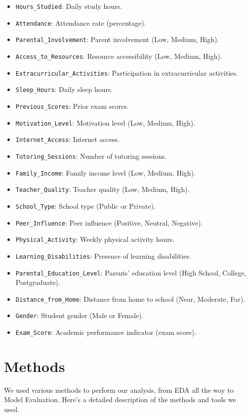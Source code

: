 \documentclass[twocolumn]{article} %
\begin{document}
\begin{itemize}
\item
  \texttt{Hours\_Studied}: Daily study hours.
\item
  \texttt{Attendance}: Attendance rate (percentage).
\item
  \texttt{Parental\_Involvement}: Parent involvement (Low, Medium, High).
\item
  \texttt{Access\_to\_Resources}: Resource accessibility (Low, Medium, High).
\item
  \texttt{Extracurricular\_Activities}: Participation in extracurricular
  activities.
\item
  \texttt{Sleep\_Hours}: Daily sleep hours.
\item
  \texttt{Previous\_Scores}: Prior exam scores.
\item
  \texttt{Motivation\_Level}: Motivation level (Low, Medium, High).
\item
  \texttt{Internet\_Access}: Internet access.
\item
  \texttt{Tutoring\_Sessions}: Number of tutoring sessions.
\item
  \texttt{Family\_Income}: Family income level (Low, Medium, High).
\item
  \texttt{Teacher\_Quality}: Teacher quality (Low, Medium, High).
\item
  \texttt{School\_Type}: School type (Public or Private).
\item
  \texttt{Peer\_Influence}: Peer influence (Positive, Neutral,
  Negative).
\item
  \texttt{Physical\_Activity}: Weekly physical activity hours.
\item
  \texttt{Learning\_Disabilities}: Presence of learning disabilities.
\item
  \texttt{Parental\_Education\_Level}: Parents' education level (High School, College, Postgraduate).
\item
  \texttt{Distance\_from\_Home}: Distance from home to school (Near, Moderate, Far).
\item
  \texttt{Gender}: Student gender (Male or Female).
\item
  \texttt{Exam\_Score}: Academic performance indicator (exam score).
\end{itemize}

\section{Methods}
We used various methods to perform our analysis, from EDA all the way to Model Evaluation. Here's a detailed description of the methods and tools we used.
\end{document}
